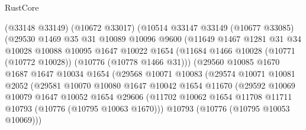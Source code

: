 \begin{lexlean}{RustCore}
\begin{coremodule}
                      (@33148 @33149)
                      (@10672 @33017)
                      (@10514
                        @33147
                        @33149
                        (@10677 @33085)
                        (@29530
                          @1469
                          @35
                          @31
                          @10089
                          @10096
                          @9600
                          (@11649
                            @1467
                            @1281
                            @31
                            @34
                            @10028
                            @10088
                            @10095
                            @1647
                            @10022
                            @1654
                            (@11684
                              @1466
                              @10028
                              (@10771 (@10772 @10028))
                              (@10776 (@10778 @1466 @31)))
                            (@29560
                              @10085
                              @1670
                              @1687
                              @1647
                              @10034
                              @1654
                              (@29568
                                @10071
                                @10083
                                (@29574
                                  @10071
                                  @10081
                                  @2052
                                  (@29581
                                    @10070
                                    @10080
                                    @1647
                                    @10042
                                    @1654
                                    @11670
                                    (@29592
                                      @10069
                                      @10079
                                      @1647
                                      @10052
                                      @1654
                                      @29606
                                      (@11702
                                        @10062
                                        @1654
                                        @11708
                                        @11711
                                        @10793
                                        (@10776 (@10795 @10063 @1670)))
                                      @10793
                                      (@10776 (@10795 @10053 @10069)))

\end{coremodule}
\end{lexlean}
